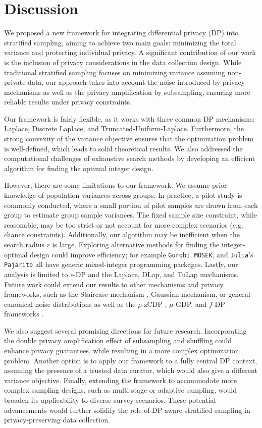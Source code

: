 \documentclass{article}
\theoremstyle{definition}
\begin{document}
\section{Discussion} \label{sec: discussion}

We proposed a new framework for integrating differential privacy (DP) into stratified sampling, aiming to achieve two main goals: minimizing the total variance and protecting individual privacy. A significant contribution of our work is the inclusion of privacy considerations in the data collection design. While traditional stratified sampling focuses on minimizing variance assuming non-private data, our approach takes into account the noise introduced by privacy mechanisms as well as the privacy amplification by subsampling, ensuring more reliable results under privacy constraints.

Our framework is fairly flexible, as it works with three common DP mechanisms: Laplace, Discrete Laplace, and Truncated-Uniform-Laplace. Furthermore, the strong convexity of the variance objective ensures that the optimization problem is well-defined, which leads to solid theoretical results. We also addressed the computational challenges of exhaustive search methods by developing an efficient algorithm for finding the optimal integer design. 

However, there are some limitations to our framework. We assume prior knowledge of population variances across groups. In practice, a pilot study is commonly conducted, where a small portion of pilot samples are drawn from each group to estimate group sample variances. The fixed sample size constraint, while reasonable, may be too strict or not account for more complex scenarios (e.g. chance constraints). Additionally, our algorithm may be inefficient when the search radius $r$ is large. Exploring alternative methods for finding the integer-optimal design could improve efficiency; for example \texttt{Gurobi}, \texttt{MOSEK}, and \texttt{Julia}'s \texttt{Pajarito} all have generic mixed-integer programming packages. Lastly, our analysis is limited to $\epsilon$-DP and the Laplace, DLap, and TuLap mechanisms. Future work could extend our results to other mechanisms and privacy frameworks, such as the Staircase mechanism \citet{geng2015optimal}, Gaussian mechanism, or general canonical noise distributions \citet{awan2023canonical} as well as the $\rho$-zCDP \citep{bun2016concentrated}, $\mu$-GDP, and $f$-DP frameworks \citep{dong2022gaussian}.

We also suggest several promising directions for future research. Incorporating the double privacy amplification effect of subsampling and shuffling \citep{Li2023locally} could enhance privacy guarantees, while resulting in a more complex optimization problem. Another option is to apply our framework to a fully central DP context, assuming the presence of a trusted data curator, which would also give a different variance objective. Finally, extending the framework to accommodate more complex sampling designs, such as multi-stage or adaptive sampling, would broaden its applicability to diverse survey scenarios. These potential advancements would further solidify the role of DP-aware stratified sampling in privacy-preserving data collection.
\end{document}
